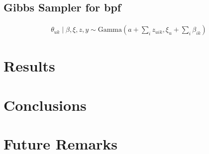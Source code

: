 \documentclass{article} %
\begin{document}
\subsection{Gibbs Sampler for \acrlong{bpf}}
\begin{align*}
	\theta_{uk} \mid \beta, \xi, z, y \sim \mathrm{Gamma}\left(a + \sum_i z_{uik}, \xi_u + \sum_i \beta_{ik} \right)
\end{align*}
\section{Results}

\section{Conclusions}

\section{Future Remarks}



\end{document}

